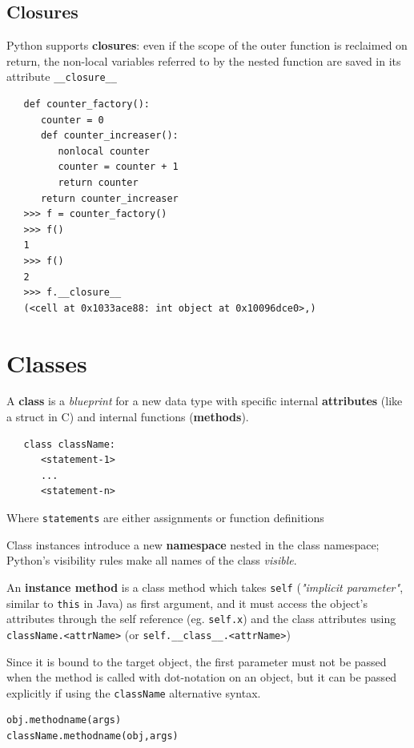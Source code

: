 \subsection{Closures}
Python supports \textbf{closures}: 
even if the scope of the
outer function is reclaimed on return, the non-local variables referred to by the nested function are saved
in its attribute \lstinline|__closure__|

\begin{lstlisting}
   def counter_factory():
      counter = 0
      def counter_increaser():
         nonlocal counter
         counter = counter + 1
         return counter
      return counter_increaser
   >>> f = counter_factory()
   >>> f()
   1
   >>> f()
   2
   >>> f.__closure__
   (<cell at 0x1033ace88: int object at 0x10096dce0>,)
\end{lstlisting}


\section{Classes}

A \textbf{class} is a \textit{blueprint} for a new data type with specific internal \textbf{attributes}
(like a struct in C) and internal functions (\textbf{methods}).

\begin{lstlisting}
   class className:
      <statement-1>
      ...
      <statement-n>
\end{lstlisting}
Where \lstinline|statements| are either assignments or function definitions

Class instances introduce a new \textbf{namespace} nested in the class
namespace; 
Python's visibility rules make all names of the class \textit{visible}.

An \textbf{instance method} is a class method which takes \lstinline|self| (\textit{"implicit parameter"}, similar to \lstinline|this| in Java) as first argument, and it  must access the object's attributes through the self reference
(eg. \lstinline|self.x|) and the class attributes using \lstinline|className.<attrName>| (or
\lstinline|self.__class__.<attrName>|)

Since it is bound to the target object, the first parameter must not be passed when the method is called with
dot-notation on an object, but it can be passed explicitly if using the \lstinline|className| alternative syntax.
\begin{lstlisting}
obj.methodname(args)
className.methodname(obj,args)
\end{lstlisting}
\nl

